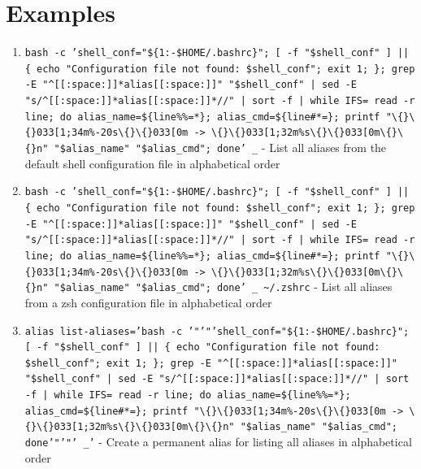 \documentclass{article}
\begin{document}
\section*{Examples}
\begin{enumerate}
  \item \texttt{bash -c 'shell\_conf="\$\{1:-\$HOME/.bashrc\}"; [ -f "\$shell\_conf" ] || \{ echo "Configuration file not found: \$shell\_conf"; exit 1; \}; grep -E "\textasciicircum{}[[:space:]]*alias[[:space:]]" "\$shell\_conf" | sed -E "s/\textasciicircum{}[[:space:]]*alias[[:space:]]*//" | sort -f | while IFS= read -r line; do alias\_name=\$\{line\%\%=*\}; alias\_cmd=\$\{line\#*=\}; printf "\textbackslash\{\}\textbackslash\{\}033[1;34m\%-20s\textbackslash\{\}\textbackslash\{\}033[0m -> \textbackslash\{\}\textbackslash\{\}033[1;32m\%s\textbackslash\{\}\textbackslash\{\}033[0m\textbackslash\{\}\textbackslash\{\}n" "\$alias\_name" "\$alias\_cmd"; done' \_} - List all aliases from the default shell configuration file in alphabetical order
  \item \texttt{bash -c 'shell\_conf="\$\{1:-\$HOME/.bashrc\}"; [ -f "\$shell\_conf" ] || \{ echo "Configuration file not found: \$shell\_conf"; exit 1; \}; grep -E "\textasciicircum{}[[:space:]]*alias[[:space:]]" "\$shell\_conf" | sed -E "s/\textasciicircum{}[[:space:]]*alias[[:space:]]*//" | sort -f | while IFS= read -r line; do alias\_name=\$\{line\%\%=*\}; alias\_cmd=\$\{line\#*=\}; printf "\textbackslash\{\}\textbackslash\{\}033[1;34m\%-20s\textbackslash\{\}\textbackslash\{\}033[0m -> \textbackslash\{\}\textbackslash\{\}033[1;32m\%s\textbackslash\{\}\textbackslash\{\}033[0m\textbackslash\{\}\textbackslash\{\}n" "\$alias\_name" "\$alias\_cmd"; done' \_ \textasciitilde{}/.zshrc} - List all aliases from a zsh configuration file in alphabetical order
  \item \texttt{alias list-aliases='bash -c '"'"'shell\_conf="\$\{1:-\$HOME/.bashrc\}"; [ -f "\$shell\_conf" ] || \{ echo "Configuration file not found: \$shell\_conf"; exit 1; \}; grep -E "\textasciicircum{}[[:space:]]*alias[[:space:]]" "\$shell\_conf" | sed -E "s/\textasciicircum{}[[:space:]]*alias[[:space:]]*//" | sort -f | while IFS= read -r line; do alias\_name=\$\{line\%\%=*\}; alias\_cmd=\$\{line\#*=\}; printf "\textbackslash\{\}\textbackslash\{\}033[1;34m\%-20s\textbackslash\{\}\textbackslash\{\}033[0m -> \textbackslash\{\}\textbackslash\{\}033[1;32m\%s\textbackslash\{\}\textbackslash\{\}033[0m\textbackslash\{\}\textbackslash\{\}n" "\$alias\_name" "\$alias\_cmd"; done'"'"' \_'} - Create a permanent alias for listing all aliases in alphabetical order
\end{enumerate}
\end{document}
